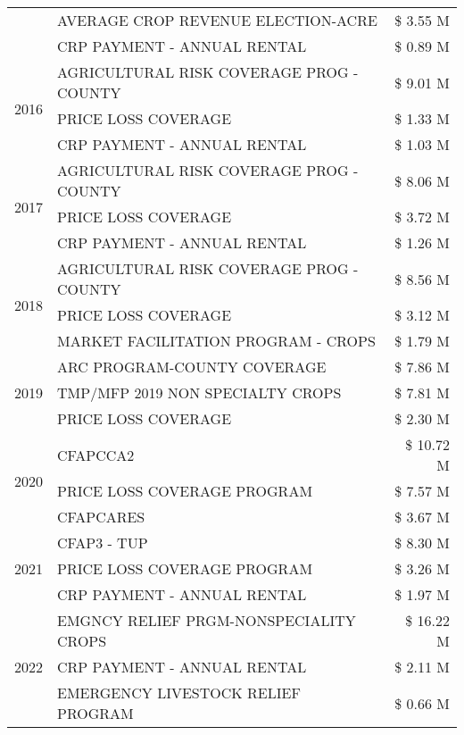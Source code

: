 \begin{tabular}{llr}
 & AVERAGE CROP REVENUE ELECTION-ACRE & \$ 3.55 M \\
 & CRP PAYMENT - ANNUAL RENTAL & \$ 0.89 M \\
\cline{1-3}
\multirow[t]{3}{*}{2016} & AGRICULTURAL RISK COVERAGE PROG - COUNTY & \$ 9.01 M \\
 & PRICE LOSS COVERAGE & \$ 1.33 M \\
 & CRP PAYMENT - ANNUAL RENTAL & \$ 1.03 M \\
\cline{1-3}
\multirow[t]{3}{*}{2017} & AGRICULTURAL RISK COVERAGE PROG - COUNTY & \$ 8.06 M \\
 & PRICE LOSS COVERAGE & \$ 3.72 M \\
 & CRP PAYMENT - ANNUAL RENTAL & \$ 1.26 M \\
\cline{1-3}
\multirow[t]{3}{*}{2018} & AGRICULTURAL RISK COVERAGE PROG - COUNTY & \$ 8.56 M \\
 & PRICE LOSS COVERAGE & \$ 3.12 M \\
 & MARKET FACILITATION PROGRAM - CROPS & \$ 1.79 M \\
\cline{1-3}
\multirow[t]{3}{*}{2019} & ARC PROGRAM-COUNTY COVERAGE & \$ 7.86 M \\
 & TMP/MFP 2019 NON SPECIALTY CROPS & \$ 7.81 M \\
 & PRICE LOSS COVERAGE & \$ 2.30 M \\
\cline{1-3}
\multirow[t]{3}{*}{2020} & CFAPCCA2 & \$ 10.72 M \\
 & PRICE LOSS COVERAGE PROGRAM & \$ 7.57 M \\
 & CFAPCARES & \$ 3.67 M \\
\cline{1-3}
\multirow[t]{3}{*}{2021} & CFAP3 - TUP & \$ 8.30 M \\
 & PRICE LOSS COVERAGE PROGRAM & \$ 3.26 M \\
 & CRP PAYMENT - ANNUAL RENTAL & \$ 1.97 M \\
\cline{1-3}
\multirow[t]{3}{*}{2022} & EMGNCY RELIEF PRGM-NONSPECIALITY CROPS & \$ 16.22 M \\
 & CRP PAYMENT - ANNUAL RENTAL & \$ 2.11 M \\
 & EMERGENCY LIVESTOCK RELIEF PROGRAM & \$ 0.66 M \\
\cline{1-3}
\bottomrule
\end{tabular}
